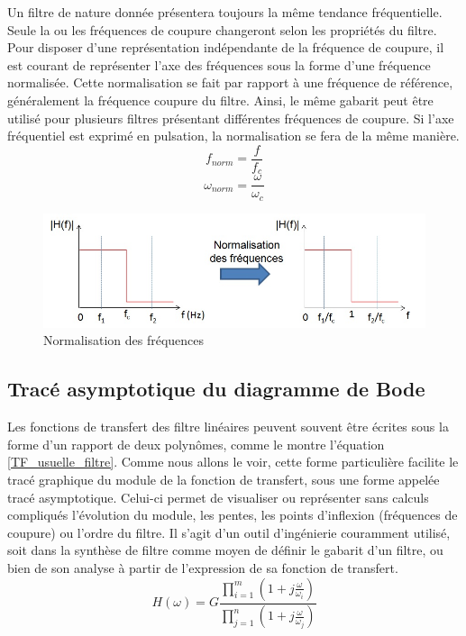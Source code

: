 	Un filtre de nature donnée présentera toujours la même tendance fréquentielle. Seule la ou les fréquences de coupure changeront selon les propriétés du filtre. Pour disposer d'une représentation indépendante de la fréquence de coupure, il est courant de représenter l'axe des fréquences sous la forme d'une fréquence normalisée. Cette normalisation se fait par rapport à une fréquence de référence, généralement la fréquence coupure du filtre. Ainsi, le même gabarit peut être utilisé pour plusieurs filtres présentant différentes fréquences de coupure. Si l'axe fréquentiel est exprimé en pulsation, la normalisation se fera de la même manière.
	\begin{equation}\label{key}
	f_{norm} = \frac{f}{f_{c}}
	\end{equation}
	\begin{equation}\label{key}
	\omega_{norm} = \frac{\omega}{\omega_{c}}
	\end{equation}
	
	\begin{figure}[h!]
		\centering
		\includegraphics[scale=0.6]{images/freq_norm.jpg}
		\caption{Normalisation des fréquences}	
		\label{Fig:freq_norm} 
	\end{figure}
	

	
	
	\subsection{Tracé asymptotique du diagramme de Bode}
	
	Les fonctions de transfert des filtre linéaires peuvent souvent être écrites sous la forme d'un rapport de deux polynômes, comme le montre l'équation \ref{TF_usuelle_filtre}. Comme nous allons le voir, cette forme particulière facilite le tracé graphique du module de la fonction de transfert, sous une forme appelée tracé asymptotique. Celui-ci permet de visualiser ou représenter sans calculs compliqués l'évolution du module, les pentes, les points d'inflexion (fréquences de coupure) ou l'ordre du filtre. Il s'agit d'un outil d'ingénierie couramment utilisé, soit dans la synthèse de filtre comme moyen de définir le gabarit d'un filtre, ou bien de son analyse à partir de l'expression de sa fonction de transfert. 
	\begin{equation}\label{TF_usuelle_filtre}
	H(\omega)=G\frac{\prod_{i=1}^{m}(1+j\frac{\omega}{\omega_{i}})}{\prod_{j=1}^{n}(1+j\frac{\omega}{\omega_{j}})}
	\end{equation}
	
